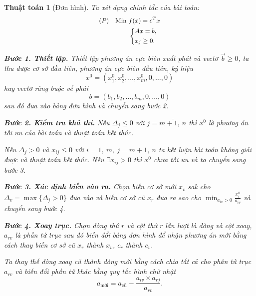 \documentclass[12pt,a4paper]{report}
\newtheorem{ttoan}{Thuật toán}
\begin{document}
\begin{ttoan}[Đơn hình]
\setlength{\parindent}{4em}
Ta xét dạng chính tắc của bài toán:
    \begin{equation} \small \label{chinhtacdonhinh}
        \begin{split}
        (P) \quad \text{Min } & f(x) = c^Tx \\
            & \left\{
            \begin{split}
            & Ax=b, \\
            & x_j \geq 0.
            \end{split}
            \right.    
        \end{split}
    \end{equation}


\noindent \textbf{Bước 1. Thiết lập.}
Thiết lập phương án cực biên xuất phát và vectơ $\vec{b} \geq 0$, ta thu được cơ sở đầu tiên, phương án cực biên đầu tiên, ký hiệu
\begin{equation}
x^0=(x_1^0,x_2^0,\ldots,x_m^0,0,\ldots,0)
\end{equation}
hay vectơ ràng buộc vế phải
\begin{equation}
b=(b_1,b_2,\ldots,b_m,0,\ldots,0)
\end{equation}
sau đó đưa vào bảng đơn hình và chuyển sang bước 2.

\noindent \textbf{Bước 2. Kiểm tra khả thi.}
Nếu $\Delta _j\leq 0$ với $j=\overline{m+1, \: n}$ thì $x^0$ là phương án tối ưu của bài toán và thuật toán kết thúc. 

Nếu $\Delta _j > 0$ và $x_{ij}\leq 0$ với $i=\overline{1,\: m}, \: j=\overline{m+1, \: n}$ ta kết luận bài toán không giải được và thuật toán kết thúc. Nếu $\exists x_{ij} > 0$ thì $x^0$ chưa tối ưu và ta chuyển sang bước 3.

\noindent \textbf{Bước 3. Xác định biến vào ra.}
Chọn biến cơ sở mới $x_v$ sak cho $\Delta _v = \max \{\Delta _j >0 \}$ đưa vào và biến cơ sở cũ $x_r$ đưa ra sao cho $\min _{a_{iv}>0} \frac{x_i^0}{a_{iv}}$ và chuyển sang bước 4.

\noindent \textbf{Bước 4. Xoay trục.}
Chọn dòng thứ $r$ và cột thứ $r$ lần lượt là dòng và cột xoay, $a_{rv}$ là phần tử trục sau đó biến đổi bảng đơn hình để nhận phương án mới bằng cách thay biến cơ sở cũ $x_r$ thành $x_v$, $c_r$ thành $c_v$.

Ta thay thế dòng xoay cũ thành dòng mới bằng cách chia tất cả cho phân tử trục $a_{rv}$ và biến đổi phần tử khác bằng quy tắc hình chữ nhật
\begin{equation}
a_{\text{mới}} = a_{\text{cũ}} - \frac{a_{iv}\times a_{rj}}{a_{rv}}.
\end{equation}

\end{ttoan}
\end{document}
